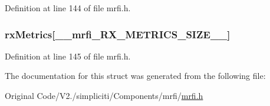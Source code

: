 \-Definition at line 144 of file mrfi.\-h.

\hypertarget{structmrfiPacket__t_a8b95fbda90600ec59752a405fd198770}{
\subsubsection[{rx\-Metrics}]{ {\bf rx\-Metrics}\mbox{[}\-\_\-\-\_\-mrfi\-\_\-\-R\-X\-\_\-\-M\-E\-T\-R\-I\-C\-S\-\_\-\-S\-I\-Z\-E\-\_\-\-\_\-\mbox{]}}}\label{structmrfiPacket__t_a8b95fbda90600ec59752a405fd198770}


\-Definition at line 145 of file mrfi.\-h.



\-The documentation for this struct was generated from the following file\-:\begin{DoxyCompactItemize}
\item 
\-Original Code/\-V2./simpliciti/\-Components/mrfi/\hyperlink{mrfi_8h}{mrfi.\-h}\end{DoxyCompactItemize}
